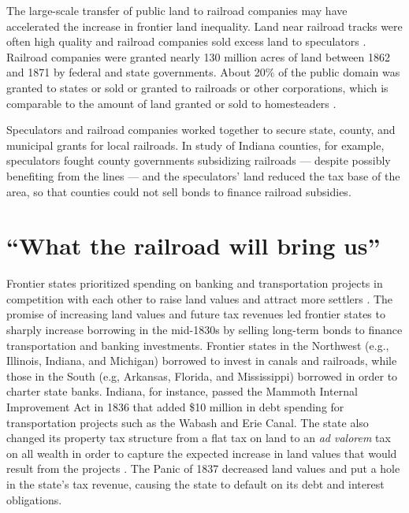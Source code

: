 The large-scale transfer of public land to railroad companies may have accelerated the increase in frontier land inequality. Land near railroad tracks were often high quality and railroad companies sold excess land to speculators \citep{murtazashvili2013political}. Railroad companies were granted nearly 130 million acres of land between 1862 and 1871 by federal and state governments. About 20\% of the public domain was granted to states or sold or granted to railroads or other corporations, which is comparable to the amount of land granted or sold to homesteaders \citep{shanks2005homestead}.

Speculators and railroad companies worked together to secure state, county, and municipal grants for local railroads. In  study of Indiana counties, for example, speculators fought county governments subsidizing railroads --- despite possibly benefiting from the lines --- and the speculators' land reduced the tax base of the area, so that counties could not sell bonds to finance railroad subsidies. 

\section{``What the railroad will bring us''} 

Frontier states prioritized spending on banking and transportation projects in competition with each other to raise land values and attract more settlers \citep{sylla1998anatomy}. The promise of increasing land values and future tax revenues led frontier states to sharply increase borrowing in the mid-1830s by selling long-term bonds to finance transportation and banking investments. Frontier states in the Northwest (e.g., Illinois, Indiana, and Michigan) borrowed to invest in canals and railroads, while those in the South (e.g, Arkansas, Florida, and Mississippi) borrowed in order to charter state banks. Indiana, for instance, passed the Mammoth Internal Improvement Act in 1836 that added \$10 million in debt spending for transportation projects such as the Wabash and Erie Canal. The state also changed its property tax structure from a flat tax on land to an \emph{ad valorem} tax on all wealth in order to capture the expected increase in land values that would result from the projects \citep{wallis2004sovereign}. The Panic of 1837 decreased land values and put a hole in the state's tax revenue, causing the state to default on its debt and interest obligations.

